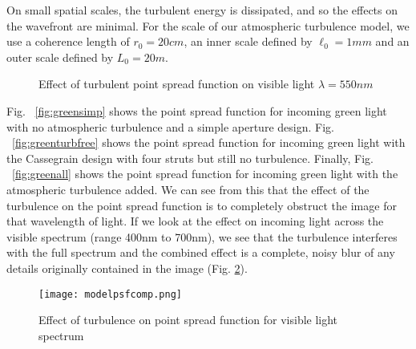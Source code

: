 \documentclass[%
 reprint,
 amsmath,amssymb,
 aps,
 pra,
]{revtex4-1}
\begin{document}
{On small spatial scales, the turbulent energy is dissipated, and so the effects on the wavefront are minimal. For the scale of our atmospheric turbulence model, we use a coherence length of $r_0 = 20cm$, an inner scale defined by $\ell_0 = 1 mm$ and an outer scale defined by $L_0 = 20 m$.
\begin{figure}[H]
\begin{minipage}{.45\textwidth}
  \centering
\end{minipage}
\begin{minipage}{.45\textwidth}
  \centering
\end{minipage}

\begin{minipage}{\textwidth}
  \centering
\end{minipage}

\caption{Effect of turbulent point spread function on visible light $\lambda=550nm$}
\label{fig:turbeffect}
\end{figure}

Fig. ~\ref{fig:greensimp} shows the point spread function for incoming green light with no atmospheric turbulence and a simple aperture design. Fig. ~\ref{fig:greenturbfree} shows the point spread function for incoming green light with the Cassegrain design with four struts but still no turbulence. Finally, Fig. ~\ref{fig:greenall} shows the point spread function for incoming green light with the atmospheric turbulence added. We can see from this that the effect of the turbulence on the point spread function is to completely obstruct the image for that wavelength of light. If we look at the effect on incoming light across the visible spectrum (range 400nm to 700nm), we see that the turbulence interferes with the full spectrum and the combined effect is a complete, noisy blur of any details originally contained in the image (Fig. \ref{fig:turbvis}).

\begin{figure}[H]
  \centering
    \texttt{[image: modelpsfcomp.png]}
\caption{Effect of turbulence on point spread function for visible light spectrum}
\label{fig:turbvis}
\end{figure}

}
\end{document}

